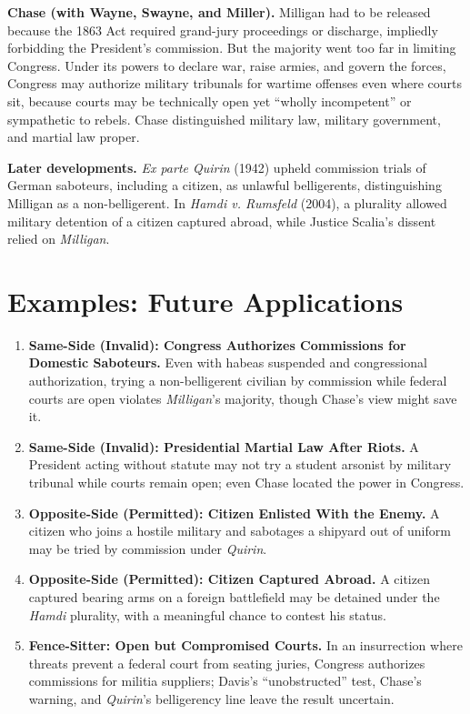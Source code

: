 \documentclass[12pt]{article}
\begin{document}
\textbf{Chase (with Wayne, Swayne, and Miller).} Milligan had to be released because the 1863 Act required grand-jury proceedings or discharge, impliedly forbidding the President's commission. But the majority went too far in limiting Congress. Under its powers to declare war, raise armies, and govern the forces, Congress may authorize military tribunals for wartime offenses even where courts sit, because courts may be technically open yet ``wholly incompetent'' or sympathetic to rebels. Chase distinguished military law, military government, and martial law proper.

\textbf{Later developments.} \textit{Ex parte Quirin} (1942) upheld commission trials of German saboteurs, including a citizen, as unlawful belligerents, distinguishing Milligan as a non-belligerent. In \textit{Hamdi v. Rumsfeld} (2004), a plurality allowed military detention of a citizen captured abroad, while Justice Scalia's dissent relied on \textit{Milligan}.

\section{Examples: Future Applications}

\begin{enumerate}
\item \textbf{Same-Side (Invalid): Congress Authorizes Commissions for Domestic Saboteurs.} Even with habeas suspended and congressional authorization, trying a non-belligerent civilian by commission while federal courts are open violates \textit{Milligan}'s majority, though Chase's view might save it.
\item \textbf{Same-Side (Invalid): Presidential Martial Law After Riots.} A President acting without statute may not try a student arsonist by military tribunal while courts remain open; even Chase located the power in Congress.
\item \textbf{Opposite-Side (Permitted): Citizen Enlisted With the Enemy.} A citizen who joins a hostile military and sabotages a shipyard out of uniform may be tried by commission under \textit{Quirin}.
\item \textbf{Opposite-Side (Permitted): Citizen Captured Abroad.} A citizen captured bearing arms on a foreign battlefield may be detained under the \textit{Hamdi} plurality, with a meaningful chance to contest his status.
\item \textbf{Fence-Sitter: Open but Compromised Courts.} In an insurrection where threats prevent a federal court from seating juries, Congress authorizes commissions for militia suppliers; Davis's ``unobstructed'' test, Chase's warning, and \textit{Quirin}'s belligerency line leave the result uncertain.
\end{enumerate}
\end{document}
